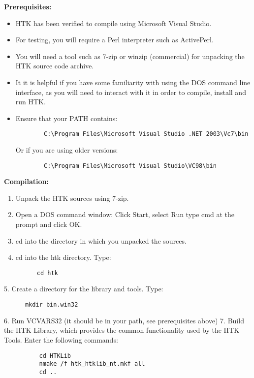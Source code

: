 \documentclass{wileySev}
\begin{document}
\textbf{Prerequisites:}
\begin{itemize}
	\item HTK has been verified to compile using Microsoft Visual Studio.
	\item For testing, you will require a Perl interpreter such as ActivePerl. 
	\item You will need a tool such as 7-zip or winzip (commercial) for unpacking the HTK source code archive.
	\item It it is helpful if you have some familiarity with using the DOS command line interface, as you will need to interact with it in order to compile, install and run HTK.
	\item Ensure that your PATH contains:
		\begin{verbatim}
		C:\Program Files\Microsoft Visual Studio .NET 2003\Vc7\bin
		\end{verbatim}
		Or if you are using older versions:
		\begin{verbatim}
		C:\Program Files\Microsoft Visual Studio\VC98\bin
		\end{verbatim}
\end{itemize}


\textbf{Compilation:}
\begin{enumerate}
\item Unpack the HTK sources using 7-zip.
\item Open a DOS command window: Click Start, select Run type cmd at the prompt and click OK.
\item cd into the directory in which you unpacked the sources.
\item cd into the htk directory. Type:
\begin{verbatim}
      cd htk
\end{verbatim}
\end{enumerate}

   5. Create a directory for the library and tools. Type:

\begin{verbatim}
      mkdir bin.win32
\end{verbatim}

   6. Run VCVARS32 (it should be in your path, see prerequisites above)
   7. Build the HTK Library, which provides the common functionality
      used by the HTK Tools. Enter the following commands:

\begin{verbatim}
          cd HTKLib
          nmake /f htk_htklib_nt.mkf all
          cd ..
\end{verbatim}
\end{document}
